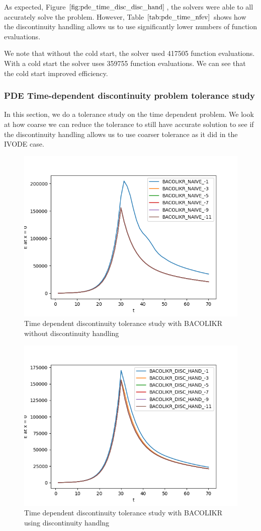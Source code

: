 \documentclass{article}
\begin{document}
As expected, Figure $\ref{fig:pde_time_disc_disc_hand}$, the solvers were able to all accurately solve the problem. However, Table $\ref{tab:pde_time_nfev}$ shows how the discontinuity handling allows us to use significantly lower numbers of function evaluations.

We note that without the cold start, the solver used 417505 function evaluations. With a cold start the solver uses 359755 function evaluations. We can see that the cold start improved efficiency.

\subsubsection{PDE Time-dependent discontinuity problem tolerance study}
\label{subsubsection:pde_time_tol}
In this section, we do a tolerance study on the time dependent problem. We look at how coarse we can reduce the tolerance to still have accurate solution to see if the discontinuity handling allows us to use coarser tolerance as it did in the IVODE case.

\begin{figure}[H]
\centering
\includegraphics[width=0.7\linewidth]{./figures/pde_time_disc_bacolikr_naive_tol}
\caption{Time dependent discontinuity tolerance study with BACOLIKR without discontinuity handling}
\label{fig:pde_time_disc_bacolikr_naive_tol}
\end{figure}

\begin{figure}[H]
\centering
\includegraphics[width=0.7\linewidth]{./figures/pde_time_disc_bacolikr_disc_hand_tol}
\caption{Time dependent discontinuity tolerance study with BACOLIKR using discontinuity handlng}
\label{fig:pde_time_disc_bacolikr_disc_hand_tol}
\end{figure}
\end{document}
